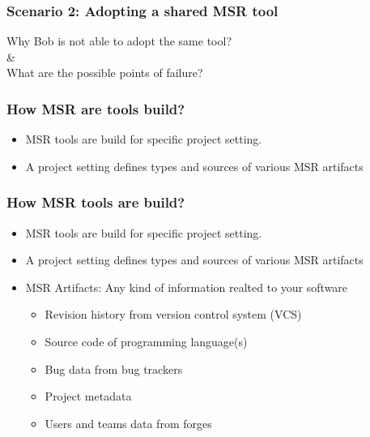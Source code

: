         \begin{frame}
            \frametitle{Scenario 2: Adopting a shared MSR tool}
             \centering
                Why Bob is not able to adopt the same tool? \\
                \& \\
                What are the possible points of failure?
        \end{frame}

        \begin{frame}
            \frametitle{How MSR are tools build?}
            \begin{itemize}
                \item MSR tools are build for specific project setting.
                \item A project setting defines types and sources of various MSR artifacts
            \end{itemize}
        \end{frame}

                \begin{frame}
                    \frametitle{How MSR tools are build?}
                    \begin{itemize}
                        \item MSR tools are build for specific project setting.
                        \item A project setting defines types and sources of various MSR artifacts
                        \item MSR Artifacts: Any kind of information realted to your software
                        \begin{itemize}
                            \item Revision history from version control system (VCS)
                            \item Source code of programming language(s)
                            \item Bug data from bug trackers
                            \item Project metadata
                            \item Users and teams data from forges
                        \end{itemize}
                    \end{itemize}
                \end{frame}

